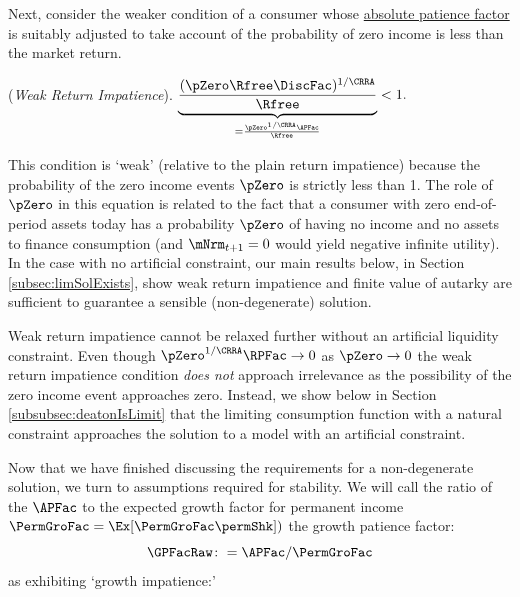 \documentclass[\econtexRoot/BufferStockTheory]{subfiles}
\begin{document}
Next, consider the weaker condition of a consumer whose \hyperlink{APFac}{absolute patience factor} is suitably adjusted to take account of the probability of zero income is less than the market return.

%
\hypertarget{WRIC}{}
\begin{assumL} (\textit{Weak Return Impatience}). \label{ass:WRIC}
$\underbrace{\frac{(\pZero \Rfree \DiscFac)^{1/\CRRA}}{\Rfree}}_{ = \frac{\pZero^{1/\CRRA} \APFac}{\Rfree}} < 1. \phantom{\text{{\WRIC}:~~}}$
%
\end{assumL}

This condition is `weak' (relative to the plain return impatience) because the probability of the zero income events $\pZero$ is strictly less than 1.
The role of $\pZero$ in this equation is related to the fact that a consumer with zero end-of-period assets today has a probability $\pZero$ of having no income and no assets to finance consumption (and $\mNrm_{t+1}=0$ would yield negative infinite utility).
In the case with no artificial constraint, our main results below, in Section \ref{subsec:limSolExists},  show weak return impatience and finite value of autarky are sufficient to guarantee a sensible (non-degenerate) solution.

Weak return impatience cannot be relaxed further without an artificial liquidity constraint.
Even though $\pZero^{1/\CRRA} \RPFac\rightarrow 0$ as $\pZero\rightarrow 0$ the weak return impatience condition \textit{does not} approach irrelevance as the possibility of the zero income event approaches zero.
Instead, we show below in Section \ref{subsubsec:deatonIsLimit} that the limiting consumption function with a natural constraint approaches the solution to a model with an artificial constraint.
% 

Now that we have finished discussing the requirements for a non-degenerate solution, we turn to assumptions required for stability.
\hypertarget{GPFacRawDefn}{}
\providecommand{\GPFacRawName}{growth patience factor} %
We will call the ratio of the $\APFac$ to the expected growth factor for permanent income $\PermGroFac = \Ex[\PermGroFac \permShk])$
the \GPFacRawName:
\begin{equation}\label{eq:GPFacRaw}
    \GPFacRaw \colon= \APFac/\PermGroFac
\end{equation}
as exhibiting `growth impatience:' 
\end{document}
